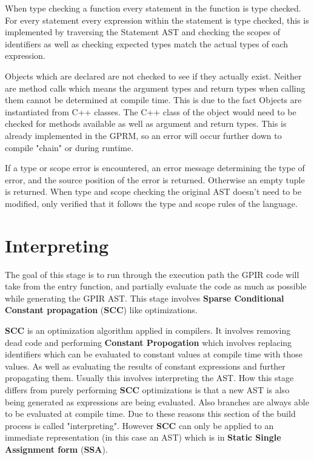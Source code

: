 When type checking a function every statement in the function is type checked.
For every statement every expression within the statement is type checked, this is 
implemented by traversing the Statement AST and checking the scopes of identifiers as well 
as checking expected types match the actual types of each expression.

Objects which are declared are not checked to see if they actually exist. Neither
are method calls which means the argument types and return types when calling them
cannot be determined at compile time. This is due to the fact Objects are instantiated from
C++ classes. The C++ class of the object would need to be checked for 
methods available as well as argument and return types. 
This is already implemented in the GPRM, so an error will occur further down to compile "chain" or during
runtime.

If a type or scope error is encountered, an error message determining the type of error,
and the source position of the error is returned. Otherwise an empty tuple is returned.
When type and scope checking the original AST doesn't need to be modified, only verified
that it follows the type and scope rules of the language.


\section{Interpreting}
\label{sec:interp}

The goal of this stage is to run through the execution path the GPIR code
will take from the entry function, and partially evaluate the code as much
as possible while generating the GPIR AST. This stage involves
\textbf{Sparse Conditional Constant propagation} (\textbf{SCC}) like optimizations.

\textbf{SCC}\cite{sccp} is an optimization algorithm applied in compilers. It involves removing
dead code and performing \textbf{Constant Propogation} which involves replacing
identifiers which can be evaluated to constant values at compile time with
those values. As well as evaluating the results of constant expressions and
further propagating them. Usually this involves interpreting
the AST. How this stage differs from purely performing \textbf{SCC} optimizations
is that a new
AST is also being generated as expressions are being evaluated. Also branches 
are always able to be evaluated at compile time. Due to these reasons this
section of the build process is called "interpreting". However
\textbf{SCC} can only be applied to an immediate representation (in this case an AST)
which is in \textbf{Static Single Assignment form} (\textbf{SSA}). 

